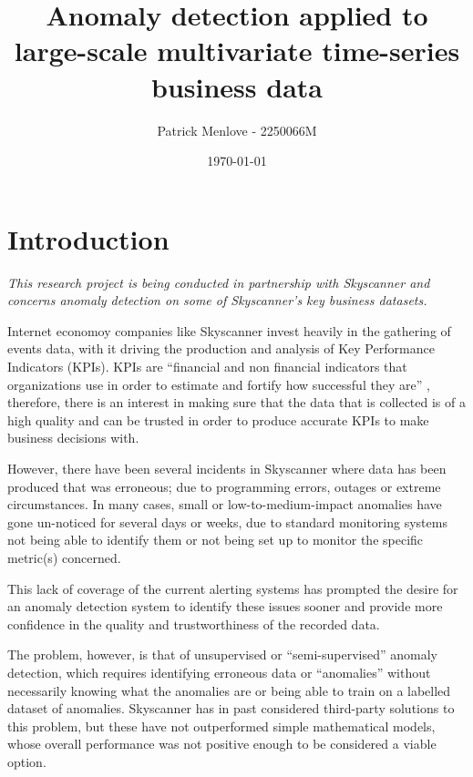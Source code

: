 \documentclass{mproj}
\begin{document}
\title{Anomaly detection applied to large-scale multivariate time-series business data}
\author{Patrick Menlove - 2250066M}
\date{\today}
\maketitle

\tableofcontents
\newpage

\section{Introduction}
\label{intro}

\textit{This research project is being conducted in partnership with Skyscanner and concerns anomaly detection on some of Skyscanner's key business datasets.}

Internet economoy companies like Skyscanner invest heavily in the gathering of events data, with it driving the production and analysis of Key Performance Indicators (KPIs). KPIs are ``financial and non financial indicators that organizations use in order to estimate and fortify how successful they are'' \citep{kpis}, therefore, there is an interest in making sure that the data that is collected is of a high quality and can be trusted in order to produce accurate KPIs to make business decisions with. 

However, there have been several incidents in Skyscanner where data has been produced that was erroneous; due to programming errors, outages or extreme circumstances. In many cases, small or low-to-medium-impact anomalies have gone un-noticed for several days or weeks, due to standard monitoring systems not being able to identify them or not being set up to monitor the specific metric(s) concerned.

This lack of coverage of the current alerting systems has prompted the desire for an anomaly detection system to identify these issues sooner and provide more confidence in the quality and trustworthiness of the recorded data.

The problem, however, is that of unsupervised or ``semi-supervised'' \citep{comparativeUnsupervisedEvaluation} anomaly detection, which requires identifying erroneous data or ``anomalies'' without necessarily knowing what the anomalies are or being able to train on a labelled dataset of anomalies. Skyscanner has in past considered third-party solutions to this problem, but these have not outperformed simple mathematical models, whose overall performance was not positive enough to be considered a viable option.
\end{document}
